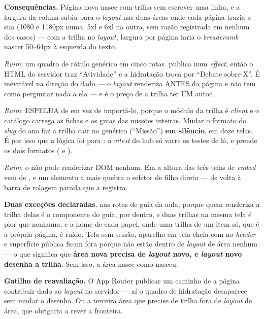 \textbf{Consequências.} Página nova nasce com trilha sem escrever uma linha, e a
largura da coluna subiu para o \emph{layout} nas duas áreas onde cada página
trazia a sua (1080 e 1180px numa, 5xl e 6xl na outra, sem razão registrada em
nenhum dos casos) --- com a trilha no \emph{layout}, largura por página faria o
\emph{breadcrumb} nascer 50--64px à esquerda do texto.

\emph{Ruim}: um quadro de rótulo genérico em cinco rotas. 
publica num \emph{effect}, então o HTML do servidor traz \enquote{Atividade} e a
hidratação troca por \enquote{Debate sobre X}. É inevitável na direção do dado
--- o \emph{layout} renderiza ANTES da página e não tem como perguntar nada a ela
--- e é o preço de a trilha ter UM autor.

\emph{Ruim}:  ESPELHA  de
 em vez de importá-lo, porque o módulo da trilha
é \emph{client} e o catálogo carrega as fichas e os guias das missões inteiras.
Mudar o formato do \emph{slug} do ano faz a trilha cair no genérico
(\enquote{Missão}) \textbf{em silêncio}, em doze telas. É por isso que a lógica
foi para : o \emph{vitest} do hub só varre os testes de lá, e
 prende os dois formatos ( e ).

\emph{Ruim}: o  não pode renderizar DOM nenhum. Em
 a altura das três telas de \emph{embed} vem de
, e um elemento a mais quebra o seletor de filho
direto --- de volta à barra de rolagem parada que a  registra.

\textbf{Duas exceções declaradas.}  nas rotas de guia da
aula, porque quem renderiza a trilha delas é o componente do guia, por dentro, e
duas trilhas na mesma tela é pior que nenhuma; e a home de cada papel, onde uma
trilha de um item só, que é a própria página, é ruído. Tela sem sessão, aparelho
em tela cheia com  no \emph{header} e superfície pública ficam fora
porque não estão dentro de \emph{layout} de área nenhum --- o que significa que
\textbf{área nova precisa de \emph{layout} novo, e \emph{layout} novo desenha a
trilha}. Sem isso, a área nasce como  nasceu.

\textbf{Gatilho de reavaliação.} O App Router publicar um caminho de a página
contribuir dado ao \emph{layout} no servidor --- aí o quadro de hidratação
desaparece sem mudar o desenho. Ou a terceira área que precise de trilha fora de
\emph{layout} de área, que obrigaria a rever a fronteira.

